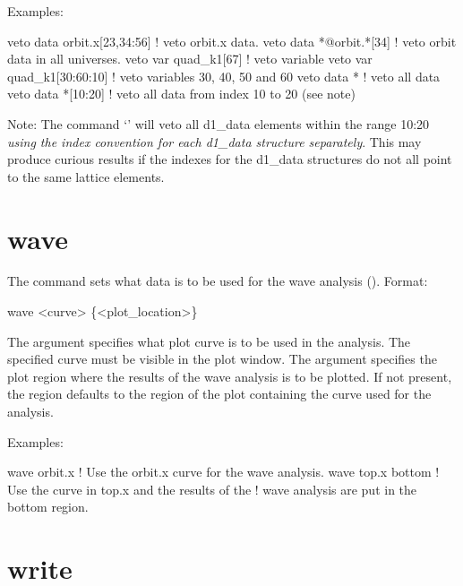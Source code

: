 {{{Examples:
\begin{example}
  veto data orbit.x[23,34:56]  ! veto orbit.x data.
  veto data *@orbit.*[34]      ! veto orbit data in all universes.
  veto var quad_k1[67]         ! veto variable
  veto var quad_k1[30:60:10]   ! veto variables 30, 40, 50 and 60
  veto data *                  ! veto all data
  veto data *[10:20]           ! veto all data from index 10 to 20 (see note)
\end{example}

Note: The command `' will veto all d1\_data elements
within the range 10:20 \textit{using the index convention for each d1\_data
structure separately}. This may produce curious results if the
indexes for the d1\_data structures do not all point to the same lattice
elements. 

\section{wave}
\label{s:wave}

The  command sets what data is to be used for the wave
analysis (). Format:
\begin{example}
  wave <curve> \{<plot_location>\}
\end{example}

\vskip 0.1in

The  argument specifies what plot curve is to be used in
the analysis. The specified curve must be visible in the plot window.
The  argument specifies the plot region where the
results of the wave analysis is to be plotted. If not present, the
region defaults to the region of the plot containing the curve used
for the analysis.

Examples:
\begin{example}
  wave orbit.x      ! Use the orbit.x curve for the wave analysis.
  wave top.x bottom ! Use the curve in top.x and the results of the 
                    !  wave analysis are put in the bottom region.
\end{example}

\section{write}
\label{s:write}

}}}
